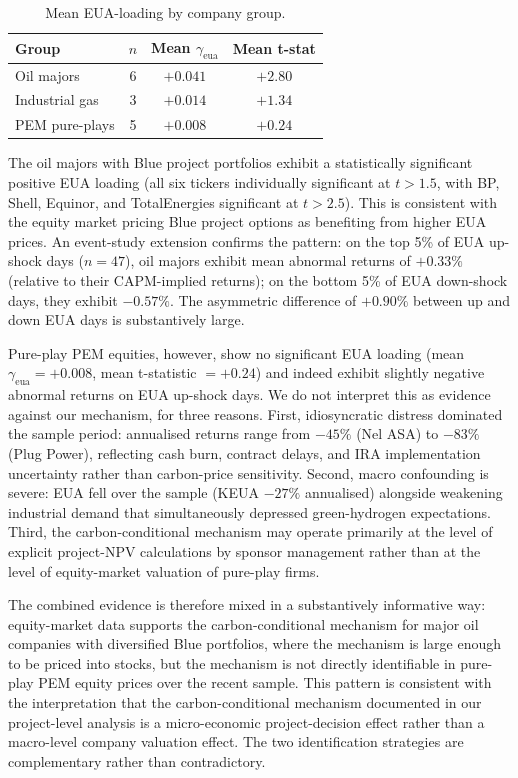 \documentclass[11pt,a4paper]{article}
\begin{document}
\begin{table}[h!]
\centering
\caption{Mean EUA-loading by company group.}
\begin{tabular}{lccc}
\toprule
Group & $n$ & Mean $\gamma_{\mathrm{eua}}$ & Mean t-stat \\
\midrule
Oil majors & 6 & $+0.041$ & $+2.80$ \\
Industrial gas & 3 & $+0.014$ & $+1.34$ \\
PEM pure-plays & 5 & $+0.008$ & $+0.24$ \\
\bottomrule
\end{tabular}
\label{tab:ch7-eua-loading}
\end{table}

The oil majors with Blue project portfolios exhibit a statistically significant positive EUA loading (all six tickers individually significant at $t > 1.5$, with BP, Shell, Equinor, and TotalEnergies significant at $t > 2.5$). This is consistent with the equity market pricing Blue project options as benefiting from higher EUA prices. An event-study extension confirms the pattern: on the top 5\% of EUA up-shock days ($n=47$), oil majors exhibit mean abnormal returns of $+0.33\%$ (relative to their CAPM-implied returns); on the bottom 5\% of EUA down-shock days, they exhibit $-0.57\%$. The asymmetric difference of $+0.90\%$ between up and down EUA days is substantively large.

Pure-play PEM equities, however, show no significant EUA loading (mean $\gamma_{\mathrm{eua}} = +0.008$, mean t-statistic $= +0.24$) and indeed exhibit slightly negative abnormal returns on EUA up-shock days. We do not interpret this as evidence against our mechanism, for three reasons. First, idiosyncratic distress dominated the sample period: annualised returns range from $-45\%$ (Nel ASA) to $-83\%$ (Plug Power), reflecting cash burn, contract delays, and IRA implementation uncertainty rather than carbon-price sensitivity. Second, macro confounding is severe: EUA fell over the sample (KEUA $-27\%$ annualised) alongside weakening industrial demand that simultaneously depressed green-hydrogen expectations. Third, the carbon-conditional mechanism may operate primarily at the level of explicit project-NPV calculations by sponsor management rather than at the level of equity-market valuation of pure-play firms.

The combined evidence is therefore mixed in a substantively informative way: equity-market data supports the carbon-conditional mechanism for major oil companies with diversified Blue portfolios, where the mechanism is large enough to be priced into stocks, but the mechanism is not directly identifiable in pure-play PEM equity prices over the recent sample. This pattern is consistent with the interpretation that the carbon-conditional mechanism documented in our project-level analysis is a micro-economic project-decision effect rather than a macro-level company valuation effect. The two identification strategies are complementary rather than contradictory.
\end{document}
